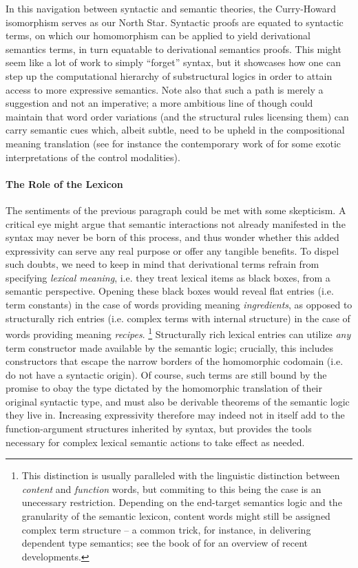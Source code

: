 In this navigation between syntactic and semantic theories, the Curry-\linebreak Howard isomorphism serves as our North Star.
Syntactic proofs are equated to syntactic terms, on which our homomorphism can be applied to yield derivational semantics terms, in turn equatable to derivational semantics proofs.
This might seem like a lot of work to simply ``forget'' syntax, but it showcases how one can step up the computational hierarchy of substructural logics in order to attain access to more expressive semantics.
Note also that such a path is merely a suggestion and not an imperative; a more ambitious line of though could maintain that word order variations (and the structural rules licensing them) can carry semantic cues which, albeit subtle, need to be upheld in the compositional meaning translation (see for instance  the contemporary work of \citet{duarte2022quantum} for some exotic interpretations of the control modalities).

\paragraph{The Role of the Lexicon}
The sentiments of the previous paragraph could be met with some skepticism.
A critical eye might argue that semantic interactions not already manifested in the syntax may never be born of this process, and thus wonder whether this added expressivity can serve any real purpose or offer any tangible benefits.
To dispel such doubts, we need to keep in mind that derivational terms refrain from specifying \textit{lexical meaning}, i.e. they treat lexical items as black boxes, from a semantic perspective.
Opening these black boxes would reveal flat entries (i.e. term constants) in the case of words providing meaning \textit{ingredients}, as opposed to structurally rich entries (i.e. complex terms with internal structure) in the case of words providing meaning \textit{recipes}.%
\footnote{This distinction is usually paralleled with the linguistic distinction between \textit{content} and \textit{function} words, but commiting to this being the case is an unecessary restriction. Depending on the end-target semantics logic and the granularity of the semantic lexicon, content words might still be assigned complex term structure -- a common trick, for instance, in delivering dependent type semantics; see the book of \citet{chatzikyriakidis2020formal} for an overview of recent developments.}
Structurally rich lexical entries can utilize \textit{any} term constructor made available by the semantic logic; crucially, this includes constructors that escape the narrow borders of the homomorphic codomain (i.e. do not have a syntactic origin).
Of course, such terms are still bound by the promise to obay the type dictated by the homomorphic translation of their original syntactic type, and must also be derivable theorems of the semantic logic they live in.
Increasing expressivity therefore may indeed not in itself add to the function-argument structures inherited by syntax, but provides the tools necessary for complex lexical semantic actions to take effect as needed.

